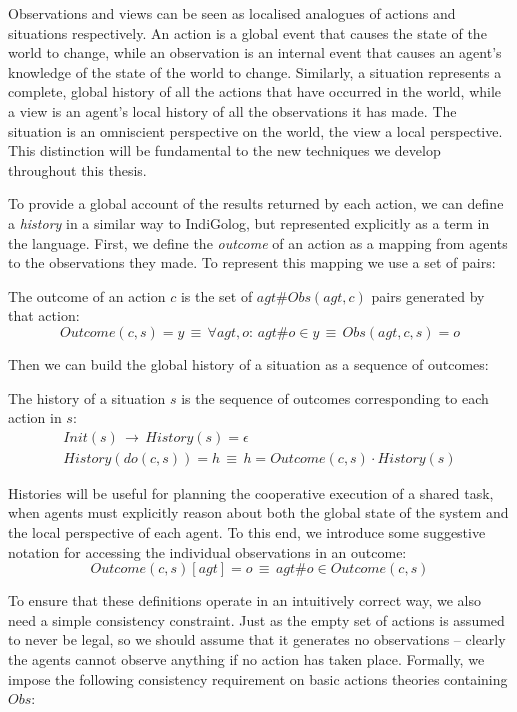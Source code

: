 Observations and views can be seen as localised analogues of actions
and situations respectively. An action is a global event that causes
the state of the world to change, while an observation is an internal
event that causes an agent's knowledge of the state of the world to
change. Similarly, a situation represents a complete, global history
of all the actions that have occurred in the world, while a view is
an agent's local history of all the observations it has made. The
situation is an omniscient perspective on the world, the view a local
perspective. This distinction will be fundamental to the new techniques
we develop throughout this thesis.

To provide a global account of the results returned by each action,
we can define a \emph{history} in a similar way to IndiGolog, but
represented explicitly as a term in the language. First, we define
the \emph{outcome} of an action as a mapping from agents to the observations
they made. To represent this mapping we use a set of 
pairs:

\begin{defnL}
[{Outcomes}] The outcome of an action $c$ is the set of
$agt\#Obs(agt,c)$ pairs generated by that action:\[
Outcome(c,s)=y\,\equiv\,\forall agt,o:\, agt\#o\in y\,\equiv\, Obs(agt,c,s)=o\]

\end{defnL}
Then we can build the global history of a situation as a sequence
of outcomes:

\begin{defnL}
[{Histories}] The history of a situation $s$ is the sequence
of outcomes corresponding to each action in $s$:\begin{gather*}
Init(s)\,\rightarrow\, History(s)=\epsilon\\
History(do(c,s))=h\,\equiv\, h=Outcome(c,s)\cdot History(s)\end{gather*}

\end{defnL}
Histories will be useful for planning the cooperative execution of
a shared task, when agents must explicitly reason about both the global
state of the system and the local perspective of each agent. To this
end, we introduce some suggestive notation for accessing the individual
observations in an outcome:\[
Outcome(c,s)[agt]=o\,\equiv\, agt\#o\in Outcome(c,s)\]


To ensure that these definitions operate in an intuitively correct
way, we also need a simple consistency constraint. Just as the empty
set of actions is assumed to never be legal, so we should assume that
it generates no observations -- clearly the agents cannot observe
anything if no action has taken place. Formally, we impose the following
consistency requirement on basic actions theories containing $Obs$:

